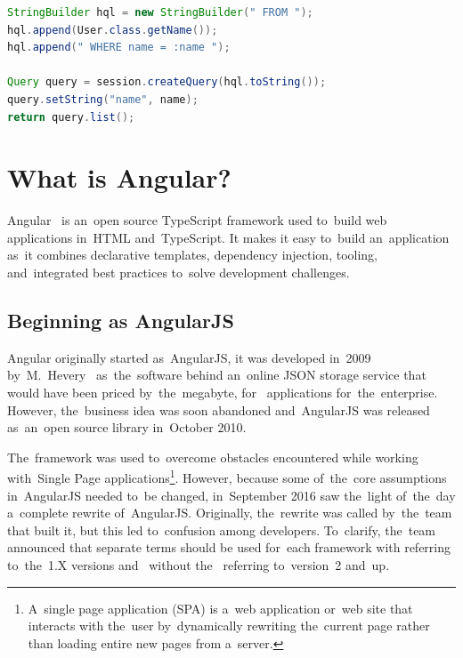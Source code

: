 \vspace{1mm}
\begin{lstlisting}[caption=An~example of~HQL query that selects users with~name
\uv{John Doe}., style=dp-default, language=Java, label=lst-hql] 
StringBuilder hql = new StringBuilder(" FROM ");
hql.append(User.class.getName());
hql.append(" WHERE name = :name ");

Query query = session.createQuery(hql.toString());
query.setString("name", name);
return query.list();
\end{lstlisting}



\section{What is Angular?}
Angular~\cite{Angular} is an~open source TypeScript framework used to~build web
applications in~HTML and~TypeScript. It makes it easy to~build an~application
as~it combines declarative templates, dependency injection, 
tooling, and~integrated best practices to~solve development challenges.


\subsection{Beginning as AngularJS}
Angular originally started as~AngularJS, it was developed in~2009
by~M.~Hevery~\cite{HeveryAngularJS} as~the~software behind an~online JSON
storage service that would have been priced by~the~megabyte,
for~ applications for~the~enterprise. However, the~business
idea was soon abandoned and~AngularJS was released as~an~open source library
in~October 2010.

The~framework was used to~overcome obstacles encountered while working
with~Single Page applications\footnote{A~single page application (SPA) is a~web
application or~web site that interacts with the~user by~dynamically rewriting
the~current page rather than loading entire new pages from a~server.}.
However, because some of~the~core assumptions in~AngularJS needed to~be changed,
in~September 2016 saw the~light of~the~day a~complete rewrite of~AngularJS.
Originally, the~rewrite was called  by~the~team that built it, but
this led to~confusion among developers. To~clarify, the~team announced that
separate terms should be used for~each framework with  referring
to~the~1.X versions and~ without the~ referring to~version~2
and~up.

